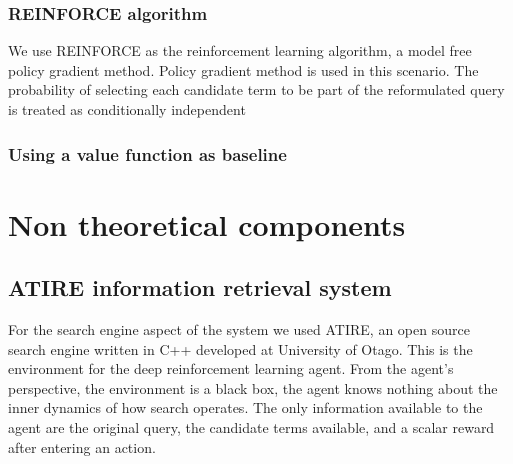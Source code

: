 \subsubsection{REINFORCE algorithm}

We use REINFORCE as the reinforcement learning algorithm, a model free policy gradient method. Policy gradient method is used in this scenario. The probability of selecting each candidate term to be part of the reformulated query is treated as conditionally independent





\subsubsection{Using a value function as baseline}










\section{Non theoretical components}

\subsection{ATIRE information retrieval system}

For the search engine aspect of the system we used ATIRE, an open source search engine written in C++ developed at University of Otago. This is the environment for the deep reinforcement learning agent. From the agent's perspective, the environment is a black box, the agent knows nothing about the inner dynamics of how search operates. The only information available to the agent are the original query, the candidate terms available, and a scalar reward after entering an action.


